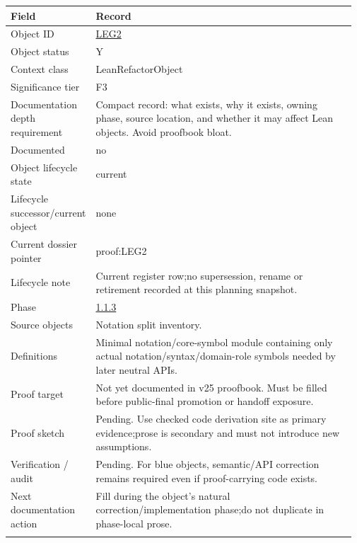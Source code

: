 \begin{longtable}{L{0.16\linewidth} L{0.81\linewidth}}
\hline
\textbf{Field} & \textbf{Record}\\
\hline
Object ID & \hyperlink{object-row-LEG2}{LEG2}\\
\hline\addlinespace[0.20em]
Object status & Y\\
\hline\addlinespace[0.20em]
Context class & LeanRefactorObject\\
\hline\addlinespace[0.20em]
Significance tier & F3\\
\hline\addlinespace[0.20em]
Documentation depth requirement & Compact record: what exists, why it exists, owning phase, source location, and whether it may affect Lean objects. Avoid proofbook bloat.\\
\hline\addlinespace[0.20em]
Documented & no\\
\hline\addlinespace[0.20em]
Object lifecycle state & current\\
\hline\addlinespace[0.20em]
Lifecycle successor/\allowbreak{}current object & none\\
\hline\addlinespace[0.20em]
Current dossier pointer & proof:LEG2\\
\hline\addlinespace[0.20em]
Lifecycle note & Current register row;\newline no supersession, rename or retirement recorded at this planning snapshot.\\
\hline\addlinespace[0.20em]
Phase & \hyperlink{phase-row-1-1-3}{1.1.3}\\
\hline\addlinespace[0.20em]
Source objects & Notation split inventory.\\
\hline\addlinespace[0.20em]
Definitions & Minimal notation/\allowbreak{}core-symbol module containing only actual notation/\allowbreak{}syntax/\allowbreak{}domain-role symbols needed by later neutral APIs.\\
\hline\addlinespace[0.20em]
Proof target & Not yet documented in v25 proofbook. Must be filled before public-final promotion or handoff exposure.\\
\hline\addlinespace[0.20em]
Proof sketch & Pending. Use checked code derivation site as primary evidence;\newline prose is secondary and must not introduce new assumptions.\\
\hline\addlinespace[0.20em]
Verification /\allowbreak{} audit & Pending. For blue objects, semantic/\allowbreak{}API correction remains required even if proof-carrying code exists.\\
\hline\addlinespace[0.20em]
Next documentation action & Fill during the object's natural correction/\allowbreak{}implementation phase;\newline do not duplicate in phase-local prose.\\
\hline\addlinespace[0.20em]
\end{longtable}
